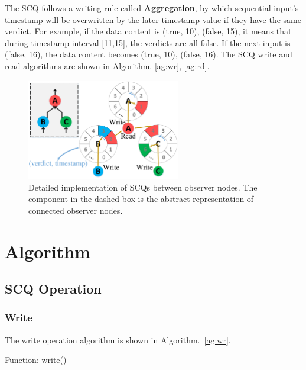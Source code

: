The SCQ follows a writing rule called \textbf{Aggregation}, by which sequential input's timestamp will be overwritten by the later timestamp value if they have the same verdict. For example, if the data content is (true, 10), (false, 15), it means that during timestamp interval [11,15], the verdicts are all false. If the next input is (false, 16), the data content becomes (true, 10), (false, 16). The SCQ write and read algorithms are shown in Algorithm. \ref{ag:wr}, \ref{ag:rd}.\par
\begin{figure}
\centering
\includegraphics[width=0.6\textwidth]{../fig/scq_cb.pdf}
\caption{\label{fig:scq}Detailed implementation of SCQs between observer nodes. The component in the dashed box is the abstract representation of connected observer nodes.}
\end{figure}





\section{Algorithm}
\subsection{SCQ Operation}

\subsubsection{Write}
The write operation algorithm is shown in Algorithm.~\ref{ag:wr}.

\begin{algorithm}
\SetAlgoLined
{}
 \caption{\label{ag:wr}Function: write()}
\end{algorithm}


